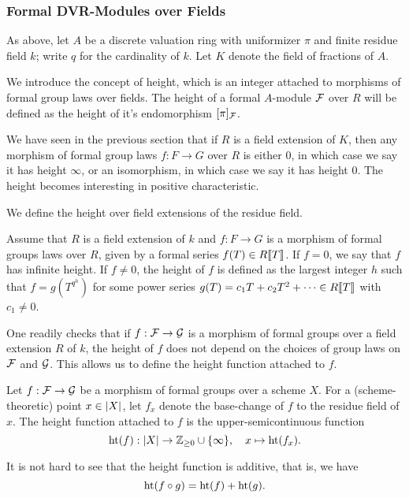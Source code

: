 \subsubsection{Formal DVR-Modules over Fields} %
\label{ssub:Formal DVR-Modules over Fields}
As above, let $A$ be a discrete valuation ring with uniformizer $\pi$ and finite 
residue field $k$; write $q$ for the cardinality of $k$. Let $K$ denote the
field of fractions of $A$.

We introduce the concept of height, which is an integer attached to
morphisms of formal group laws over fields. The height of a formal $A$-module
$\mathcal{F}$ over $R$ will be defined as the height of it's endomorphism $[\pi]_{\mathcal{F}}$. 

We have seen in the previous section that if $R$ is a field extension of $K$,
then any morphism of formal group laws $f: F \to G$ over $R$ is either $0$, in
which case we say it has height $\infty$, or an isomorphism, in which case we
say it has height $0$. The height becomes interesting in positive
characteristic. 

We define the height over field extensions of the residue field. 
\begin{defi}
  Assume that $R$ is a field extension of $k$ and $f: F \to G$ is a morphism of 
  formal groups laws over $R$, given by a formal series $f(T) \in R\llbracket T \rrbracket$. 
  If $f = 0$, we say that $f$ has infinite height. 
  If $f \neq 0$, the height of $f$ is defined as the largest integer $h$ such that 
  $f = g(T^{q^h})$ for some power series $g(T) = c_1 T + c_2 T^2 + \dots \in
  R\llbracket T \rrbracket$ with $c_1 \neq 0$. 
\end{defi}
One readily checks that if $f: \mathcal{F} \to \mathcal{G}$ is a morphism of formal groups over
a field extension $R$ of $k$, the height of $f$ does not depend on the choices
of group laws on $\mathcal{F}$ and $\mathcal{G}$. This allows us to define the height function 
attached to $f$. 
\begin{defi}
  Let $f: \mathcal{F} \to \mathcal{G}$ be a morphism of formal groups over a scheme $X$.
  For a (scheme-theoretic) point $x \in \lvert X \rvert$, let $f_x$ denote the 
  base-change of $f$ to the residue field of $x$. 
  The height function attached to $f$ is the upper-semicontinuous function
  \begin{equation} \label{eq:defheight}
    \textnormal{ht}(f) : \lvert X \rvert \to \mathbb{Z}_{\geq 0} \cup \{\infty\}, \quad x \mapsto 
    \textnormal{ht}(f_x).
  \end{equation}
\end{defi}
It is not hard to see that the height function is additive, that is, we have
\begin{equation*}
  \textnormal{ht}(f \circ g) = \textnormal{ht}(f) + \textnormal{ht}(g).
\end{equation*}

